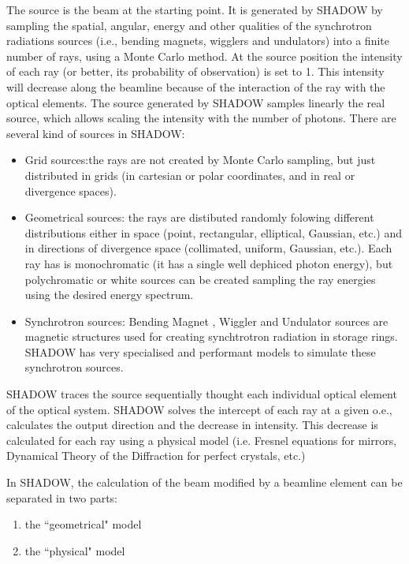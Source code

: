 The source is the beam at the starting point. It is generated by SHADOW by sampling the spatial, angular, energy and other qualities of the synchrotron radiations sources (i.e., bending magnets, wigglers and undulators) into a finite number of rays, using a Monte Carlo method. At the source position the intensity of each ray (or better, its probability of observation) is set to 1. This intensity will decrease along the beamline because of the interaction of the ray with the optical elements. The source generated by SHADOW samples linearly the real source, which allows scaling the intensity with the number of photons. There are several kind of sources in SHADOW:
\begin{itemize}
    \item Grid sources:the rays are not created by Monte Carlo sampling, but just distributed in grids (in cartesian or polar coordinates, and in real or divergence spaces).
    \item Geometrical sources: the rays are distibuted randomly folowing different distributions either in space (point, rectangular, elliptical, Gaussian, etc.) and in directions of divergence space (collimated, uniform, Gaussian, etc.). Each ray has is monochromatic (it has a single well dephiced photon energy), but polychromatic or white sources can be created sampling the ray energies using the desired energy spectrum.
    \item Synchrotron sources: Bending Magnet \cite{S4bendingmagnets}, Wiggler and Undulator \cite{S4undulators} sources are magnetic structures used for creating synchtrotron radiation in storage rings. SHADOW has very specialised and performant models to simulate these synchrotron sources. 
\end{itemize}

SHADOW traces the source sequentially thought each individual optical element of the optical system. SHADOW solves the intercept of each ray at a given o.e., calculates the output direction and the decrease in intensity. This decrease is calculated for each ray using a physical model (i.e. Fresnel equations for mirrors, Dynamical Theory of the Diffraction for perfect crystals, etc.)

In SHADOW, the  calculation of the beam modified by a beamline element can be separated in two parts: 
\begin{enumerate}
    \item the ``geometrical" model
    \item the ``physical" model
\end{enumerate}

